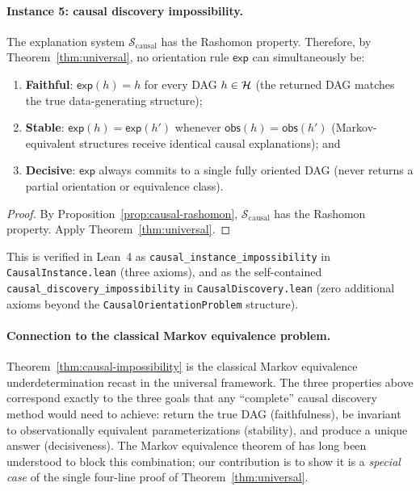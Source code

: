 \paragraph{Instance 5: causal discovery impossibility.}

\begin{theorem}
\label{thm:causal-impossibility}
The explanation system $\mathcal{S}_{\mathrm{causal}}$ has the Rashomon
property.  Therefore, by Theorem~\ref{thm:universal}, no orientation rule
$\mathsf{exp}$ can simultaneously be:
\begin{enumerate}
  \item \textbf{Faithful}: $\mathsf{exp}(h) = h$ for every DAG $h \in \mathcal{H}$
    (the returned DAG matches the true data-generating structure);
  \item \textbf{Stable}: $\mathsf{exp}(h) = \mathsf{exp}(h')$ whenever
    $\mathsf{obs}(h) = \mathsf{obs}(h')$ (Markov-equivalent structures
    receive identical causal explanations); and
  \item \textbf{Decisive}: $\mathsf{exp}$ always commits to a single fully
    oriented DAG (never returns a partial orientation or equivalence class).
\end{enumerate}
\end{theorem}

\begin{proof}
By Proposition~\ref{prop:causal-rashomon}, $\mathcal{S}_{\mathrm{causal}}$
has the Rashomon property.  Apply Theorem~\ref{thm:universal}.
\end{proof}

{\raggedright
This is verified in Lean~4 as
\texttt{causal\_instance\_impossibility} in
\texttt{CausalInstance.lean} (three axioms), and as the
self-contained \texttt{causal\_discovery\_impossibility}
in \texttt{CausalDiscovery.lean} (zero additional axioms
beyond the \texttt{CausalOrientationProblem} structure).\par}

\paragraph{Connection to the classical Markov equivalence problem.}
Theorem~\ref{thm:causal-impossibility} is the classical Markov equivalence underdetermination
recast in the universal framework.  The three properties above correspond
exactly to the three goals that any ``complete'' causal discovery method would
need to achieve: return the true DAG (faithfulness), be invariant to
observationally equivalent parameterizations (stability), and produce a unique
answer (decisiveness).  The Markov equivalence theorem of
\citet{verma1991equivalence} has long been understood to block this
combination; our contribution is to show it is a \emph{special case} of the
single four-line proof of Theorem~\ref{thm:universal}.

